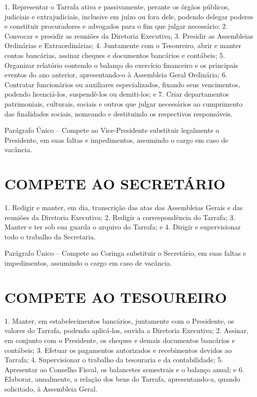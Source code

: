 \documentclass[a4paper]{report}
\begin{document}
1. Representar o Tarrafa ativa e passivamente, perante os órgãos públicos,
   judiciais e extrajudiciais, inclusive em juízo ou fora dele, podendo
   delegar poderes e constituir procuradores e advogados para o fim que julgar
   necessário;
2. Convocar e presidir as reuniões da Diretoria Executiva;
3. Presidir as Assembleias Ordinárias e Extraordinárias;
4. Juntamente com o Tesoureiro, abrir e manter contas bancárias, assinar
   cheques e documentos bancários e contábeis;
5. Organizar relatório contendo o balanço do exercício financeiro e os
   principais eventos do ano anterior, apresentando-o à Assembleia Geral
   Ordinária;
6. Contratar funcionários ou auxiliares especializados, fixando seus
   vencimentos, podendo licenciá-los, suspendê-los ou demiti-los; e
7. Criar departamentos patrimoniais, culturais, sociais e outros
   que julgar necessários ao cumprimento das finalidades sociais, nomeando e
   destituindo os respectivos responsáveis.

Parágrafo Único –
Compete ao Vice-Presidente substituir legalmente o Presidente, em suas
faltas e impedimentos, assumindo o cargo em caso de vacância.

\section{COMPETE AO SECRETÁRIO}

1. Redigir e manter, em dia, transcrição das atas das Assembleias Gerais
   e das reuniões da Diretoria Executiva;
2. Redigir a correspondência do Tarrafa;
3. Manter e ter sob sua guarda o arquivo do Tarrafa; e
4. Dirigir e supervisionar todo o trabalho da Secretaria.

Parágrafo Único –
Compete ao Coringa substituir o Secretário, em suas faltas e impedimentos,
assumindo o cargo em caso de vacância.

\section{COMPETE AO TESOUREIRO}

1. Manter, em estabelecimentos bancários, juntamente com o Presidente, os
   valores do Tarrafa, podendo aplicá-los, ouvida a Diretoria Executiva;
2. Assinar, em conjunto com o Presidente, os cheques e demais documentos
   bancários e contábeis;
3. Efetuar os pagamentos autorizados e recebimentos devidos ao Tarrafa;
4. Supervisionar o trabalho da tesouraria e da contabilidade;
5. Apresentar ao Conselho Fiscal, os balancetes semestrais e o balanço anual; e
6. Elaborar, anualmente, a relação dos bens do Tarrafa, apresentando-a,
   quando solicitado, à Assembleia Geral.
\end{document}
